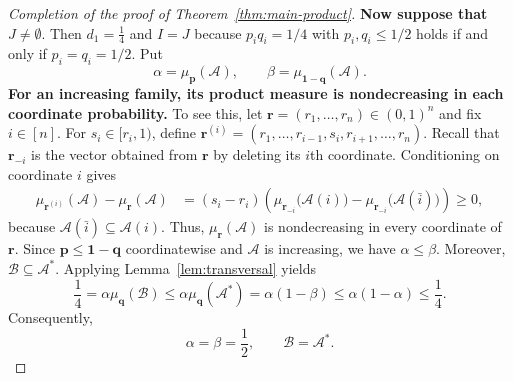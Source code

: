 \documentclass[11pt]{article}
\numberwithin{equation}{section}
\theoremstyle{definition}
\theoremstyle{remark}
\begin{document}
\begin{proof}[Completion of the proof of Theorem~\ref{thm:main-product}]
\textbf{Now suppose that $J\neq\emptyset$}.  Then
$
 d_1=\frac14
$
and
$
 I=J$
because $p_iq_i=1/4$ with $p_i,q_i\leq1/2$ holds if and only if
$p_i=q_i=1/2$.
Put
\begin{equation*}
 \alpha=\mu_{\mathbf p}(\mathcal{A}),
 \qquad
 \beta=\mu_{\mathbf 1-\mathbf q}(\mathcal{A}).
\end{equation*}
\textbf{For an increasing family, its product measure is nondecreasing in each
coordinate probability.}  To see this, let
$
 \mathbf r=(r_1,\ldots,r_n)\in(0,1)^n
$
and fix $i\in[n]$.  For $s_i\in[r_i,1)$, define
$
 \mathbf r^{(i)}
 =
 (r_1,\ldots,r_{i-1},s_i,r_{i+1},\ldots,r_n).
$
Recall that $\mathbf r_{-i}$ is the vector obtained from $\mathbf r$ by
deleting its $i$th coordinate.  Conditioning on coordinate $i$ gives
\begin{align*}
 \mu_{\mathbf r^{(i)}}(\mathcal{A})
 -
 \mu_{\mathbf r}(\mathcal{A})
 &=
 (s_i-r_i)
 \left(
  \mu_{\mathbf r_{-i}}\bigl(\mathcal{A}(i)\bigr)
  -
  \mu_{\mathbf r_{-i}}\bigl(\mathcal{A}(\bar i)\bigr)
 \right)\geq0,
\end{align*}
because $\mathcal{A}(\bar i)\subseteq\mathcal{A}(i)$.
Thus, $\mu_{\mathbf r}(\mathcal{A})$ is nondecreasing in every
coordinate of $\mathbf r$.
Since $\mathbf p\leq\mathbf 1-\mathbf q$ coordinatewise and
$\mathcal{A}$ is increasing, we have $\alpha\leq\beta$. 
Moreover,
$\mathcal{B}\subseteq\mathcal{A}^*$.  Applying Lemma~\ref{lem:transversal} yields
\begin{equation*}
 \frac14
 =
 \alpha\mu_{\mathbf q}(\mathcal{B})
 \leq
 \alpha\mu_{\mathbf q}(\mathcal{A}^*)
 =
 \alpha(1-\beta)
 \leq
 \alpha(1-\alpha)
 \leq
 \frac14.
\end{equation*}
 Consequently,
$$
 \alpha=\beta=\frac12,
 \qquad
 \mathcal{B}=\mathcal{A}^*.
 $$



\end{proof}
\end{document}

